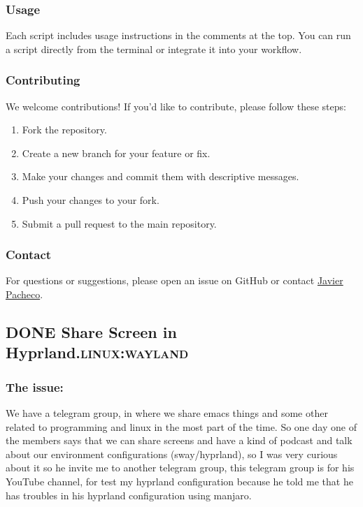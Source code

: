 \documentclass[11pt]{article}
\begin{document}
\subsubsection{Usage}
\label{sec:org67bc362}
Each script includes usage instructions in the comments at the top. You can run a script directly from the terminal or integrate it into your workflow.
\subsubsection{Contributing}
\label{sec:org7d38595}
We welcome contributions! If you'd like to contribute, please follow these steps:

\begin{enumerate}
\item Fork the repository.
\item Create a new branch for your feature or fix.
\item Make your changes and commit them with descriptive messages.
\item Push your changes to your fork.
\item Submit a pull request to the main repository.
\end{enumerate}
\subsubsection{Contact}
\label{sec:org8e3b04e}
For questions or suggestions, please open an issue on GitHub or contact \href{mailto:javier@jpacheco.xyz}{Javier Pacheco}.
\subsection{{\bfseries\sffamily DONE} Share Screen in Hyprland.\hfill{}\textsc{linux:wayland}}
\label{sec:orgc783128}
\subsubsection{The issue:}
\label{sec:org9c17956}
We have a telegram group, in where we share emacs things and some other related to programming and linux in the most part of the time. So one day one of the members says that we can share screens and have a kind of podcast and talk about our environment configurations (sway/hyprland), so I was very curious about it so he invite me to another telegram group, this telegram group is for his YouTube channel, for test my hyprland configuration because he told me that he has troubles in his hyprland configuration using manjaro.
\end{document}
